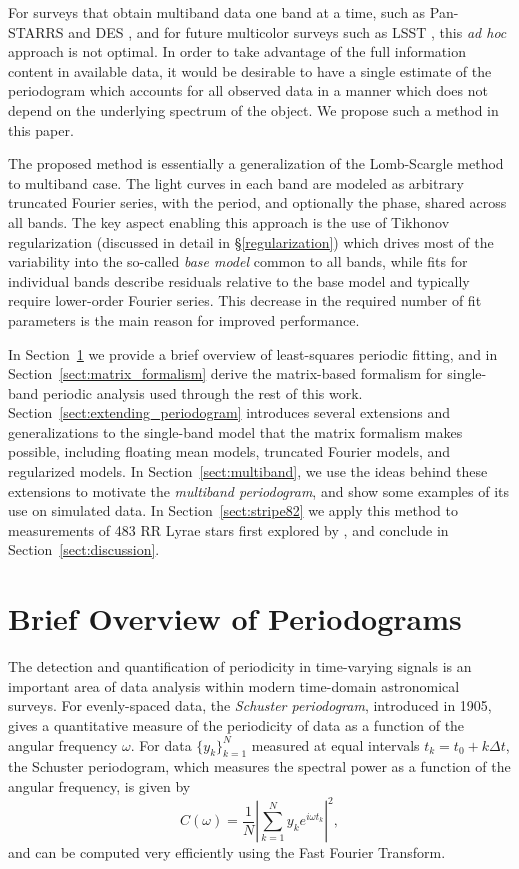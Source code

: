 \documentclass[12pt,preprint]{aastex}
\newcommand{\foreign}[1]{{\it #1}}
\newcommand{\adhoc}{\foreign{ad hoc}}
\newcommand{\eqlabel}[1]{\label{eq:#1}}
\newcommand{\Sect}[1]{Section~\ref{sect:#1}}
\newcommand{\sect}[1]{\Sect{#1}}
\newcommand{\sectlabel}[1]{\label{sect:#1}}
\begin{document}
For surveys that obtain multiband data one band at a time, such as Pan-STARRS \citep{Kaiser2010} and DES \citep{Flaugher08},
and for future multicolor surveys such as LSST \citep{Ivezic08LSST}, this \adhoc{} approach is not optimal. In order to take 
advantage of the full information content in available data, it would be desirable to have a single estimate of the periodogram 
which accounts for all observed data in a manner which does not depend on the underlying spectrum of the object. 
We propose such a method in this paper. 

The proposed method is essentially a generalization of the Lomb-Scargle method to 
multiband case. The light curves in  each band are modeled as arbitrary truncated Fourier series, 
with the period, and optionally the phase, shared across all bands. The key aspect enabling this approach is the use of Tikhonov regularization 
(discussed in detail in \S \ref{regularization}) which drives most of the variability into the so-called {\it base 
model} common to all bands, while fits for individual bands describe residuals relative to the base model 
and typically require lower-order Fourier series. This decrease in the required number of fit parameters is the
main reason for improved performance. 

In \sect{brief_overview} we provide a brief overview of least-squares periodic fitting, and in \sect{matrix_formalism} derive the matrix-based formalism for single-band periodic analysis used through the rest of this work.
\sect{extending_periodogram} introduces several extensions and generalizations to the single-band model that the matrix formalism makes possible, including floating mean models, truncated Fourier models, and regularized models.
In \sect{multiband}, we use the ideas behind these extensions to motivate the {\it multiband periodogram}, and show some examples of its use on simulated data.
In \sect{stripe82} we apply this method to measurements of 483 RR Lyrae stars first explored by \citet[][hereafter S10]{Sesar2010}, and conclude in \sect{discussion}.

\section{Brief Overview of Periodograms}
\sectlabel{brief_overview}

The detection and quantification of periodicity in time-varying signals is an important area of data analysis within modern time-domain astronomical surveys.
For evenly-spaced data, the {\it Schuster periodogram}, introduced in 1905, gives a quantitative measure of the periodicity of data as a function of the angular frequency $\omega$. For data $\{y_k\}_{k=1}^N$ measured at equal intervals $t_k = t_0 + k\Delta t$, the Schuster periodogram, which measures the spectral power as a function of the angular frequency, is given by
\begin{equation}
  \eqlabel{Schuster}
  C(\omega) = \frac{1}{N}\left| \sum_{k=1}^N y_k e^{i\omega t_k} \right|^2,
\end{equation}
and can be computed very efficiently using the Fast Fourier Transform.
\end{document}
